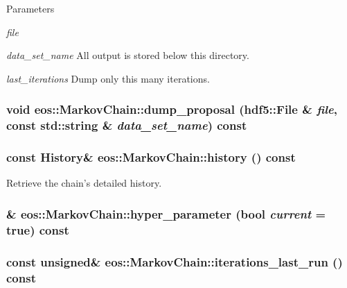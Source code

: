 \begin{DoxyParams}{Parameters}
\item[{\em file}]\item[{\em data\_\-set\_\-name}]All output is stored below this directory. \item[{\em last\_\-iterations}]Dump only this many iterations. \end{DoxyParams}
\hypertarget{classeos_1_1MarkovChain_a89a777f8c14787db1e803995ee77d862}{
\subsubsection[{dump\_\-proposal}]{\setlength{\rightskip}{0pt plus 5cm}void eos::MarkovChain::dump\_\-proposal ({\bf hdf5::File} \& {\em file}, \/  const std::string \& {\em data\_\-set\_\-name}) const}}
\label{classeos_1_1MarkovChain_a89a777f8c14787db1e803995ee77d862}
\hypertarget{classeos_1_1MarkovChain_ae1ef51057e7a205fbc9d04a5e913fb06}{
\subsubsection[{history}]{\setlength{\rightskip}{0pt plus 5cm}const {\bf History}\& eos::MarkovChain::history () const}}
\label{classeos_1_1MarkovChain_ae1ef51057e7a205fbc9d04a5e913fb06}


Retrieve the chain's detailed history. \hypertarget{classeos_1_1MarkovChain_aa3055684326d68700ebeb994b878d8db}{
\subsubsection[{hyper\_\-parameter}]{\& eos::MarkovChain::hyper\_\-parameter (bool {\em current} = {\ttfamily true}) const}}
\label{classeos_1_1MarkovChain_aa3055684326d68700ebeb994b878d8db}
\hypertarget{classeos_1_1MarkovChain_a3a9c62e634a375bffbb3fba0b7794b69}{
\subsubsection[{iterations\_\-last\_\-run}]{\setlength{\rightskip}{0pt plus 5cm}const unsigned\& eos::MarkovChain::iterations\_\-last\_\-run () const}}
\label{classeos_1_1MarkovChain_a3a9c62e634a375bffbb3fba0b7794b69}


